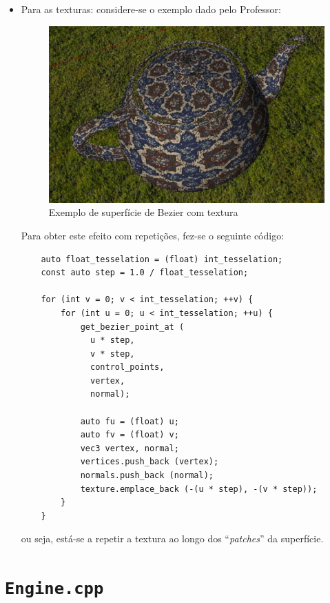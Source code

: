 \documentclass[11pt,a4paper]{report}%
\begin{document}
\begin{itemize}
  \item Para as texturas: considere-se o exemplo dado pelo Professor:
  
  \begin{figure}[H]
    \centering
    \includegraphics[scale=1]{bezier_texture.jpg}
    \caption{Exemplo de superfície de Bezier com textura}
    \label{fig:bezier_texture}
  \end{figure}

  Para obter este efeito com repetições, fez-se o seguinte código:

  \begin{lstlisting}
    auto float_tesselation = (float) int_tesselation;
    const auto step = 1.0 / float_tesselation;
    
    for (int v = 0; v < int_tesselation; ++v) {
        for (int u = 0; u < int_tesselation; ++u) {
            get_bezier_point_at (
              u * step,
              v * step,
              control_points,
              vertex,
              normal);
    
            auto fu = (float) u;
            auto fv = (float) v;
            vec3 vertex, normal;
            vertices.push_back (vertex);
            normals.push_back (normal);
            texture.emplace_back (-(u * step), -(v * step));
        }
    }
  \end{lstlisting}

  ou seja, está-se a repetir a textura ao longo dos ``\textit{patches}'' da superfície.

\end{itemize}

\newpage

\section{\texttt{Engine.cpp}}
\end{document}
